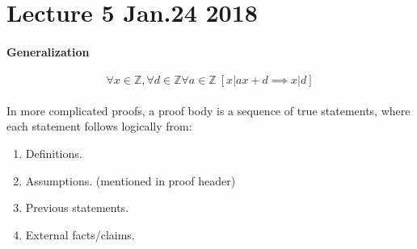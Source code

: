 \documentclass{article}
\begin{document}
	\section{Lecture 5 Jan.24 2018}
	\paragraph{Generalization}
	\[
		\forall x \in \mathbb{Z}, \forall d \in \mathbb{Z} \forall a \in \mathbb{Z}\ [x \vert ax + d \implies x \vert d]
	\]
	\paragraph{} In more complicated proofs, a proof body is a sequence of true statements, where each statement follows logically from:
	\begin{enumerate}
		\item Definitions.
		\item Assumptions. (mentioned in proof header)
		\item Previous statements.
		\item External facts/claims.
	\end{enumerate}
\end{document}
